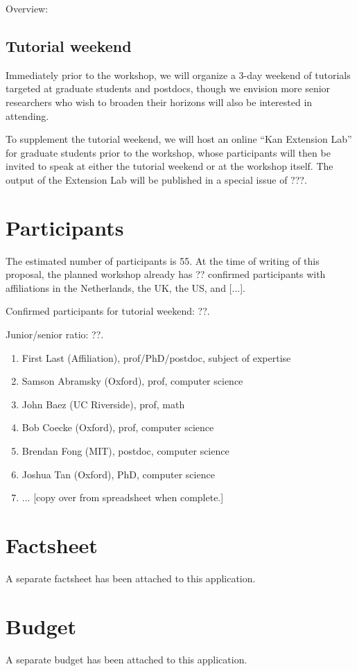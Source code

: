 \documentclass{article}
\newcommand{\redout}[1]{{\color{red}#1}}
\begin{document}
Overview: 


\subsection{Tutorial weekend}
Immediately prior to the workshop, we will organize a 3-day weekend of tutorials targeted at graduate students and postdocs, though we envision more senior researchers who wish to broaden their horizons will also be interested in attending.

To supplement the tutorial weekend, we will host an online ``Kan Extension Lab'' for graduate students prior to the workshop, whose participants will then be invited to speak at either the tutorial weekend or at the workshop itself. The output of the Extension Lab will be published in a special issue of \redout{???}.

\section{Participants}
The estimated number of participants is 55. At the time of writing of this proposal, the planned workshop already has ?? confirmed participants with affiliations in the Netherlands, the UK, the US, and [...].

Confirmed participants for tutorial weekend: ??. 

Junior/senior ratio: ??.

\begin{enumerate}
\item First Last (Affiliation), prof/PhD/postdoc, subject of expertise
\item Samson Abramsky (Oxford), prof, computer science
\item John Baez (UC Riverside), prof, math
\item Bob Coecke (Oxford), prof, computer science
\item Brendan Fong (MIT), postdoc, computer science
\item Joshua Tan (Oxford), PhD, computer science
\item ... [copy over from spreadsheet when complete.]
\end{enumerate}

\section{Factsheet}
A separate factsheet has been attached to this application.

\section{Budget}
A separate budget has been attached to this application.
\end{document}
